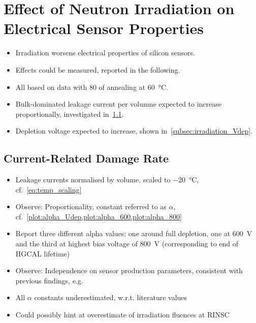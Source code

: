 \section{Effect of Neutron Irradiation on Electrical Sensor Properties}
\label{sec:irradiation}

\begin{itemize}
	\item Irradiation worsens electrical properties of silicon sensors.
	\item Effects could be measured, reported in the following.
	\item All based on data with \SI{80}{\min} of annealing at \SI{60}{\celsius}.
	\item Bulk-dominated leakage current per volumne expected to increase proportionally, investigated in~\ref{subsec:irradiation_alpha}.
	\item Depletion voltage expected to increase, shown in~\ref{subsec:irradiation_Vdep}.
\end{itemize}

\subsection{Current-Related Damage Rate}
\label{subsec:irradiation_alpha}

\begin{itemize}
	\item Leakage currents normalised by volume, scaled to \SI{-20}{\celsius}, cf.~\ref{eq:temp_scaling}
	\item Observe: Proportionality, constant referred to as $\alpha$, cf.~\ref{plot:alpha_Udep,plot:alpha_600,plot:alpha_800}
	\item Report three different alpha values: one around full depletion, one at \SI{600}{\volt} and the third at highest bias voltage of \SI{800}{\volt} (corresponding to end of HGCAL lifetime)
	\item Observe: Independence on sensor production parameters, consistent with previous findings, e.g.~\cite{moll:SiDamages}
	\item All $\alpha$ constants underestimated, w.r.t. literature values
	\item Could possibly hint at overestimate of irradiation fluences at RINSC
\end{itemize}

